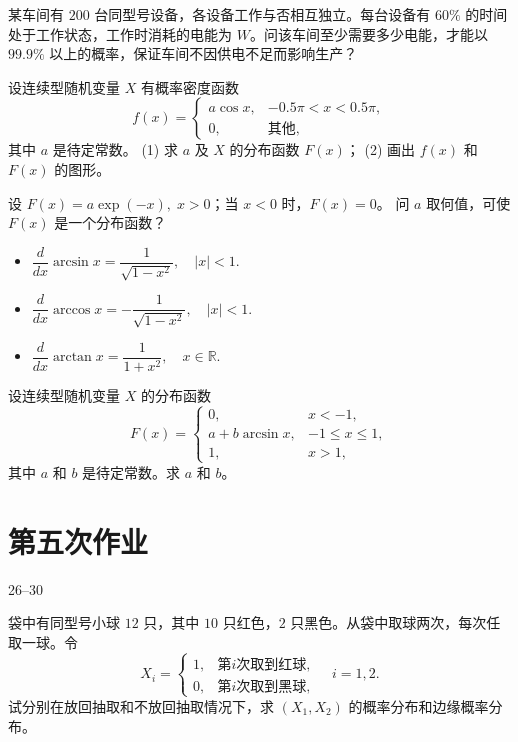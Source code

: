 \begin{homework}[2.22]
某车间有 $200$ 台同型号设备，各设备工作与否相互独立。每台设备有 $60\%$ 的时间处于工作状态，工作时消耗的电能为 $W$。问该车间至少需要多少电能，才能以 $99.9\%$ 以上的概率，保证车间不因供电不足而影响生产？
\end{homework}

\begin{homework}[2.23]
设连续型随机变量 $X$ 有概率密度函数
\[
f(x) =
\begin{cases}
a \cos x, & -0.5\pi < x < 0.5\pi, \\[6pt]
0, & \text{其他},
\end{cases}
\]
其中 $a$ 是待定常数。  
(1) 求 $a$ 及 $X$ 的分布函数 $F(x)$；  
(2) 画出 $f(x)$ 和 $F(x)$ 的图形。
\end{homework}

\begin{homework}[2.24]
设 $F(x) = a \exp(-x), \; x > 0$；当 $x < 0$ 时，$F(x) = 0$。  
问 $a$ 取何值，可使 $F(x)$ 是一个分布函数？
\end{homework}
\begin{dxtips}
    \begin{itemize}
  \item $\dfrac{d}{dx}\arcsin x=\dfrac{1}{\sqrt{1-x^2}},\quad |x|<1.$
  \item $\dfrac{d}{dx}\arccos x=-\dfrac{1}{\sqrt{1-x^2}},\quad |x|<1.$
  \item $\dfrac{d}{dx}\arctan x=\dfrac{1}{1+x^2},\quad x\in\mathbb R.$
\end{itemize}
\end{dxtips}
\begin{homework}[2.25]
设连续型随机变量 $X$ 的分布函数
\[
F(x) =
\begin{cases}
0, & x < -1, \\[6pt]
a + b \arcsin x, & -1 \leq x \leq 1, \\[6pt]
1, & x > 1,
\end{cases}
\]
其中 $a$ 和 $b$ 是待定常数。求 $a$ 和 $b$。
\end{homework}
\section{第五次作业}
26--30

\begin{homework}[26]
袋中有同型号小球 $12$ 只，其中 $10$ 只红色，$2$ 只黑色。从袋中取球两次，每次任取一球。令
\[
X_i =
\begin{cases}
1, & 第 i 次取到红球, \\
0, & 第 i 次取到黑球,
\end{cases}
\quad i=1,2.
\]
试分别在放回抽取和不放回抽取情况下，求 $(X_1, X_2)$ 的概率分布和边缘概率分布。
\end{homework}

